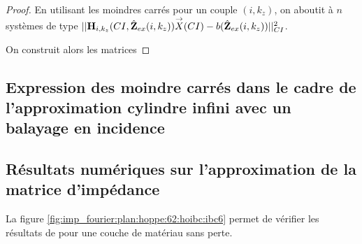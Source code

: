       \begin{proof}
        En utilisant les moindres carrés pour un couple \((i,k_z)\), on aboutit à \(n\) systèmes de type
        \( || \mathbf{H}_{i,k_z}(CI,\hat{\mathbf{Z}}_{ex}(i,k_z)) {\overset{\rightarrow}{X}}(CI) - b(\hat{\mathbf{Z}}_{ex}(i,k_z)) ||^2_{CI} \).

        On construit alors les matrices
      \end{proof}

  \subsection{Expression des moindre carrés dans le cadre de l'approximation cylindre infini avec un balayage en incidence}

  \subsection{Résultats numériques sur l'approximation de la matrice d'impédance}

    La figure \ref{fig:imp_fourier:plan:hoppe:62:hoibc:ibc6} permet de vérifier les résultats de \cite[p.~62]{hoppe_impedance_1995} pour une couche de matériau sans perte.


